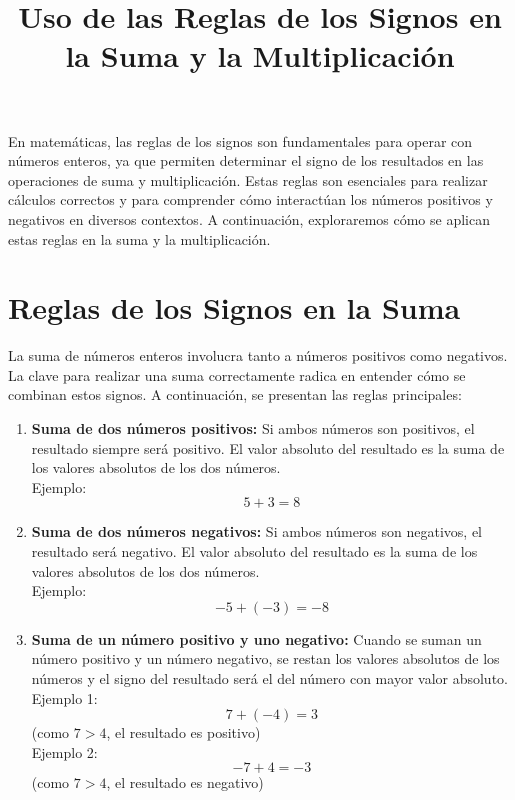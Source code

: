 \documentclass{article}
\begin{document}
\title{Uso de las Reglas de los Signos en la Suma y la Multiplicación}
\author{}
\date{}
\maketitle

En matemáticas, las reglas de los signos son fundamentales para operar con números enteros, ya que permiten determinar el signo de los resultados en las operaciones de suma y multiplicación. Estas reglas son esenciales para realizar cálculos correctos y para comprender cómo interactúan los números positivos y negativos en diversos contextos. A continuación, exploraremos cómo se aplican estas reglas en la suma y la multiplicación.

\section*{Reglas de los Signos en la Suma}

La suma de números enteros involucra tanto a números positivos como negativos. La clave para realizar una suma correctamente radica en entender cómo se combinan estos signos. A continuación, se presentan las reglas principales:

\begin{enumerate}
    \item \textbf{Suma de dos números positivos:} Si ambos números son positivos, el resultado siempre será positivo. El valor absoluto del resultado es la suma de los valores absolutos de los dos números.\\
    Ejemplo:  
    \[
    5 + 3 = 8
    \]

    \item \textbf{Suma de dos números negativos:} Si ambos números son negativos, el resultado será negativo. El valor absoluto del resultado es la suma de los valores absolutos de los dos números.\\
    Ejemplo:  
    \[
    -5 + (-3) = -8
    \]

    \item \textbf{Suma de un número positivo y uno negativo:} Cuando se suman un número positivo y un número negativo, se restan los valores absolutos de los números y el signo del resultado será el del número con mayor valor absoluto.\\
    Ejemplo 1:  
    \[
    7 + (-4) = 3
    \] (como \(7 > 4\), el resultado es positivo)\\
    Ejemplo 2:  
    \[
    -7 + 4 = -3
    \] (como \(7 > 4\), el resultado es negativo)
\end{enumerate}
\end{document}
